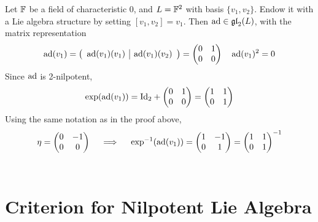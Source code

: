 \documentclass{article}
\begin{document}
\begin{example}
    Let $\mathbb{F}$ be a field of characteristic $0$, and $L = \mathbb{F}^2$ with basis $\{v_1, v_2\}$. Endow it with a Lie algebra structure by setting $[v_1, v_2] = v_1$. Then $\operatorname{ad} \in \mathfrak{gl}_2(L)$, with the matrix representation
    \[
        \operatorname{ad}(v_1) = 
        \left(
        \begin{array}{c|c}
            \operatorname{ad}(v_1)(v_1) & \operatorname{ad}(v_1)(v_2) \\
        \end{array}
        \right)
        = 
        \begin{pmatrix}
            0 & 1 \\
            0 & 0
        \end{pmatrix}
        \quad
        \operatorname{ad}(v_1)^2 = 0
    \]
    Since $\operatorname{ad}$ is 2-nilpotent, 
    \[
        \exp(\operatorname{ad}(v_1)) = \mathrm{Id}_2 + 
        \begin{pmatrix}
            0 & 1 \\
            0 & 0
        \end{pmatrix}
        =
        \begin{pmatrix}
            1 & 1 \\
            0 & 1
        \end{pmatrix}
    \]
    Using the same notation as in the proof above,
    \[
        \eta =
        \begin{pmatrix}
            0 & -1 \\
            0 & 0
        \end{pmatrix}
        \quad \ \Longrightarrow\  \quad
        \exp^{-1}(\operatorname{ad}(v_1)) =
        \begin{pmatrix}
            1 & -1 \\
            0 & 1
        \end{pmatrix}
        =
        \begin{pmatrix}
            1 & 1 \\
            0 & 1
        \end{pmatrix}^{-1}
    \]
    \ 
\end{example}

\section{Criterion for Nilpotent Lie Algebra}
\end{document}
